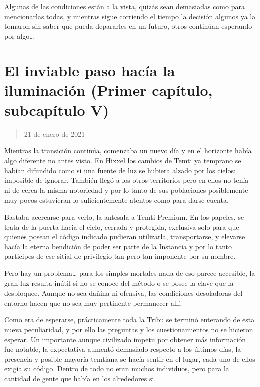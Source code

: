 \documentclass[
  spanish,
]{book}
\begin{document}
Algunas de las condiciones están a la vista, quizás sean demasiadas como para mencionarlas todas, y mientras sigue corriendo el tiempo la decisión algunos ya la tomaron sin saber que pueda depararles en un futuro, otros continúan esperando por algo\ldots{}

\hypertarget{el-inviable-paso-hacuxeda-la-iluminaciuxf3n-primer-capuxedtulo-subcapuxedtulo-v}{%
\section{El inviable paso hacía la iluminación (Primer capítulo, subcapítulo V)}\label{el-inviable-paso-hacuxeda-la-iluminaciuxf3n-primer-capuxedtulo-subcapuxedtulo-v}}

\begin{quote}
21 de enero de 2021
\end{quote}

Mientras la transición continúa, comenzaba un nuevo día y en el horizonte había algo diferente no antes visto. En Hixxel los cambios de Temti ya temprano se habían difundido como si una fuente de luz se hubiera alzado por los cielos: imposible de ignorar. También llegó a los otros territorios pero en ellos no tenía ni de cerca la misma notoriedad y por lo tanto de sus poblaciones posiblemente muy pocos estuvieran lo suficientemente atentos como para darse cuenta.

Bastaba acercarse para verlo, la antesala a Temti Premium. En los papeles, se trata de la puerta hacia el cielo, cerrada y protegida, exclusiva solo para que quienes posean el código indicado pudieran utilizarla, transportarse, y elevarse hacía la eterna bendición de poder ser parte de la Instancia y por lo tanto participes de ese sitial de privilegio tan pero tan imponente por su nombre.

Pero hay un problema\ldots{} para los simples mortales nada de eso parece accesible, la gran luz resulta inútil si no se conoce del método o se posee la clave que la desbloquee. Aunque no sea dañina ni ofensiva, las condiciones desoladoras del entorno hacen que no sea muy pertinente permanecer allí.

Como era de esperarse, prácticamente toda la Tribu se terminó enterando de esta nueva peculiaridad, y por ello las preguntas y los cuestionamientos no se hicieron esperar. Un importante aunque civilizado ímpetu por obtener más información fue notable, la expectativa aumentó demasiado respecto a los últimos días, la presencia y posible mayoría temtiana se hacía sentir en el lugar, cada uno de ellos exigía su código. Dentro de todo no eran muchos individuos, pero para la cantidad de gente que había en los alrededores si.
\end{document}
